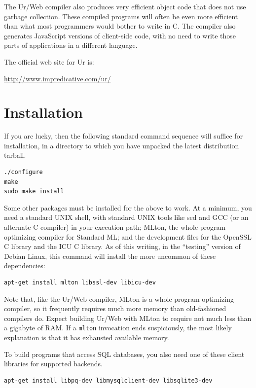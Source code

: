 \documentclass{article}
\begin{document}
The Ur/Web compiler also produces very efficient object code that does not use garbage collection.  These compiled programs will often be even more efficient than what most programmers would bother to write in C.  The compiler also generates JavaScript versions of client-side code, with no need to write those parts of applications in a different language.

\medskip

The official web site for Ur is:
\begin{center}
  \url{http://www.impredicative.com/ur/}
\end{center}


\section{Installation}

If you are lucky, then the following standard command sequence will suffice for installation, in a directory to which you have unpacked the latest distribution tarball.

\begin{verbatim}
./configure
make
sudo make install
\end{verbatim}

Some other packages must be installed for the above to work.  At a minimum, you need a standard UNIX shell, with standard UNIX tools like sed and GCC (or an alternate C compiler) in your execution path; MLton, the whole-program optimizing compiler for Standard ML; and the development files for the OpenSSL C library and the ICU C library.  As of this writing, in the ``testing'' version of Debian Linux, this command will install the more uncommon of these dependencies:
\begin{verbatim}
apt-get install mlton libssl-dev libicu-dev
\end{verbatim}

Note that, like the Ur/Web compiler, MLton is a whole-program optimizing compiler, so it frequently requires much more memory than old-fashioned compilers do.  Expect building Ur/Web with MLton to require not much less than a gigabyte of RAM.  If a \texttt{mlton} invocation ends suspiciously, the most likely explanation is that it has exhausted available memory.

To build programs that access SQL databases, you also need one of these client libraries for supported backends.
\begin{verbatim}
apt-get install libpq-dev libmysqlclient-dev libsqlite3-dev
\end{verbatim}
\end{document}
